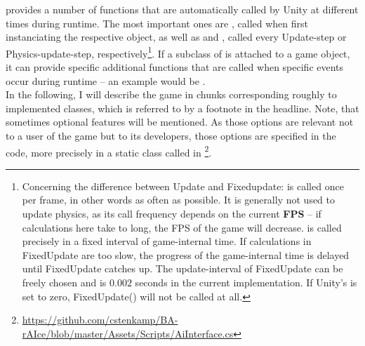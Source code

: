  provides a number of functions that are automatically called by Unity at different times during runtime. The most important ones are , called when first instanciating the respective object, as well as  and , called every Update-step or Physics-update-step, respectively\footnote{Concerning the difference between Update and Fixedupdate:  is called once per frame, in other words as often as possible. It is generally not used to update physics, as its call frequency depends on the current \textbf{FPS} -- if calculations here take to long, the FPS of the game will decrease.  is called precisely in a fixed interval of game-internal time. If calculations in FixedUpdate are too slow, the progress of the game-internal time is delayed until FixedUpdate catches up. The update-interval of FixedUpdate can be freely chosen and is $0.002$ seconds in the current implementation. If Unity's  is set to zero, FixedUpdate() will not be called at all.}. If a subclass of  is attached to a game object, it can provide specific additional functions that are called when specific events occur during runtime -- an example would be .\\

In the following, I will describe the game in chunks corresponding roughly to implemented classes, which is referred to by a footnote in the headline. Note, that sometimes optional features will be mentioned. As those options are relevant not to a user of the game but to its developers, those options are specified in the code, more precisely in a static class called  in \footnote{\label{aiint} \url{https://github.com/cstenkamp/BA-rAIce/blob/master/Assets/Scripts/AiInterface.cs}}.




